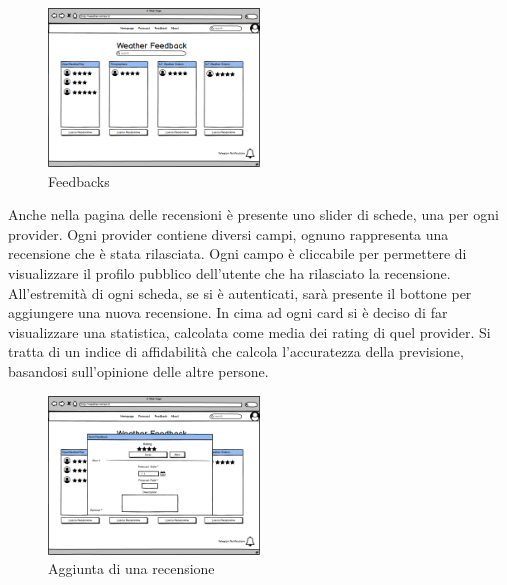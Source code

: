\begin{figure}[H]
    \caption{Feedbacks}
    \label{fig:Home}
    \centering
    \includegraphics[width=0.5\textwidth]{MockUps/feedback.png}
\end{figure}
Anche nella pagina delle recensioni è presente uno slider di schede, una per ogni provider. 
Ogni provider contiene diversi campi, ognuno rappresenta una recensione che è stata rilasciata. Ogni campo è cliccabile per permettere di visualizzare il profilo pubblico dell'utente che ha rilasciato la recensione. All'estremità di ogni scheda, se si è autenticati, sarà presente il bottone per aggiungere una nuova recensione.
In cima ad ogni card si è deciso di far visualizzare una statistica, calcolata come media dei rating di quel provider. Si tratta di un indice di affidabilità che calcola l'accuratezza della previsione, basandosi sull'opinione delle altre persone.



\begin{figure}[H]
    \caption{Aggiunta di una recensione}
    \label{fig:Home}
    \centering
    \includegraphics[width=0.5\textwidth]{MockUps/sendFeedback.png}
\end{figure}

